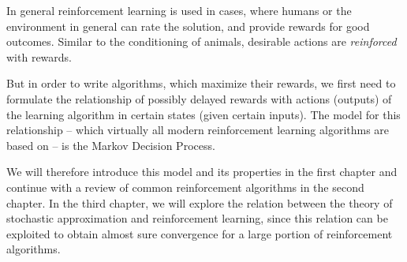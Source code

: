     In general reinforcement learning is used in cases, where humans or the environment in general can rate the solution, and provide rewards for good outcomes. Similar to the conditioning of animals, desirable actions are \emph{reinforced} with rewards. 

    But in order to write algorithms, which maximize their rewards, we first need to formulate the relationship of possibly delayed rewards with actions (outputs) of the learning algorithm in certain states (given certain inputs). The model for this relationship -- which virtually all modern reinforcement learning algorithms are based on -- is the Markov Decision Process. 
    
    We will therefore introduce this model and its properties in the first chapter and continue with a review of common reinforcement algorithms in the second chapter. In the third chapter, we will explore the relation between the theory of stochastic approximation and reinforcement learning, since this relation can be exploited to obtain almost sure convergence for a large portion of reinforcement algorithms.
\endinput
